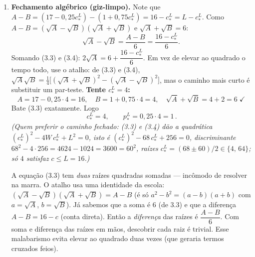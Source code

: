 \documentclass[11pt,a4paper]{article}
\newcommand{\dc}[2]{#1{,}#2}
\begin{document}
\begin{enumerate}[leftmargin=2em,itemsep=4pt]
\begin{empalavras}
Tradução da equação central: estamos \textbf{prendendo} o contrato do $L$ no maior tamanho
que ainda \emph{não tente} o $H$ a imitá-lo. O lado esquerdo, $\sqrt{W - p^H} = \sqrt{9} =
3$, é a satisfação do $H$ \emph{no contrato dele} (cobertura completa, consumo certo $9$).
O lado direito é a satisfação que o $H$ teria \emph{se mentisse} e pegasse o contrato barato
do $L$: aí ele ficaria \emph{exposto ao risco} — com probabilidade $1 - \pi^H$ não há
sinistro (consumo $A$) e com $\pi^H$ há sinistro (consumo $B$), daí a média ponderada das
duas raízes. Igualar os dois lados é dizer ``o $H$ é \emph{exatamente indiferente} entre ser
honesto e mentir''. Esse é o ponto em que a \textbf{IC do $H$ fica binding}: encolhemos a
cobertura do $L$ até bem ali, nem um milímetro a mais (senão o $H$ mentiria e a separação
quebra), nem a menos (senão estaríamos punindo o $L$ sem necessidade). $A$ e $B$ são só
apelidos para o consumo do $L$ nos estados ``sem sinistro'' e ``com sinistro''.
\end{empalavras}

\item \textbf{Fechamento algébrico (giz-limpo).} Note que
$A - B = (17 - \dc{0}{25}c^L_\ast) - (1 + \dc{0}{75}c^L_\ast) = 16 - c^L_\ast = L - c^L_\ast$.
Como $A-B = (\sqrt{A}-\sqrt{B})(\sqrt{A}+\sqrt{B})$ e $\sqrt{A}+\sqrt{B}=6$:
\[
\sqrt{A} - \sqrt{B} = \frac{A-B}{6} = \frac{16 - c^L_\ast}{6}. \tag{3.4}
\]
Somando (3.3) e (3.4): $2\sqrt{A} = 6 + \dfrac{16-c^L_\ast}{6}$. Em vez de elevar ao
quadrado o tempo todo, use o atalho: de (3.3) e (3.4), $\sqrt{A}\sqrt{B} =
\frac{1}{4}\big[(\sqrt{A}+\sqrt{B})^2 - (\sqrt{A}-\sqrt{B})^2\big]$, mas o caminho mais
curto é substituir um par-teste. \textbf{Tente $c^L_\ast = 4$:}
\[
A = 17 - \dc{0}{25}\cdot 4 = 16, \quad B = 1 + \dc{0}{75}\cdot 4 = 4,
\quad \sqrt{A}+\sqrt{B} = 4 + 2 = 6 \;\checkmark
\]
Bate (3.3) exatamente. Logo
\[
\boxed{\,c^L_\ast = 4, \qquad p^L_\ast = \dc{0}{25}\cdot 4 = 1\,}. \tag{3.5}
\]
\emph{(Quem preferir o caminho fechado: (3.3) e (3.4) dão a quadrática
$(c^L_\ast)^2 - 4W\,c^L_\ast + L^2 = 0$, isto é $(c^L_\ast)^2 - 68\,c^L_\ast + 256 = 0$,
discriminante $68^2 - 4\cdot256 = 4624 - 1024 = 3600 = 60^2$, raízes
$c^L_\ast = (68\pm 60)/2 \in \{4,\,64\}$; só $4$ satisfaz $c\le L=16$.)}

\begin{empalavras}[O truque do $\sqrt{A}-\sqrt{B}$ e por que dá para ``chutar'' $c = 4$]
A equação (3.3) tem \emph{duas} raízes quadradas somadas — incômodo de resolver na marra.
O atalho usa uma identidade da escola: $(\sqrt{A}-\sqrt{B})(\sqrt{A}+\sqrt{B}) = A - B$
(é só $a^2 - b^2 = (a-b)(a+b)$ com $a = \sqrt{A}$, $b = \sqrt{B}$). Já sabemos que a soma é
$6$ (de 3.3) e que a diferença $A - B = 16 - c$ (conta direta). Então a \emph{diferença} das
raízes é $\dfrac{A-B}{6}$. Com soma e diferença das raízes em mãos, descobrir cada raiz é
trivial. Esse malabarismo evita elevar ao quadrado duas vezes (que geraria termos cruzados
feios).


\end{empalavras}
\end{enumerate}
\end{document}
